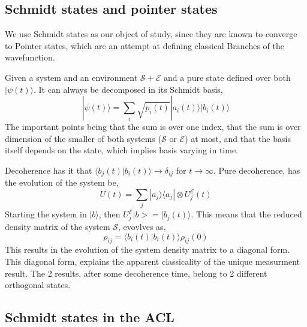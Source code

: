 \documentclass{article}
\begin{document}
\subsection{Schmidt states and pointer states}

We use Schmidt states as our object of study, since they are known to converge to Pointer states, which are an attempt at defining classical Branches of the wavefunction.


Given a system and an environment $\mathcal{S} + \mathcal{E}$ and a pure state defined over both $|\psi(t)\rangle$. It can always be decomposed in its Schmidt basis,
\begin{equation}
    |\psi(t)\rangle = \sum_i \sqrt{p_i(t)}|a_i(t)\rangle|b_i(t)\rangle
\end{equation}
The important points being that the sum is over one index, that the sum is over dimension of the smaller of both systems ($\mathcal{S}$ or $\mathcal{E}$) at most, and that the basis itself depends on the state, which implies basis varying in time.

Decoherence has it that $\langle b_j(t)|b_i(t)\rangle\rightarrow \delta_{ij}$ for $t\rightarrow \infty$. 
Pure decoherence, has the evolution of the system be,
\begin{equation}
    U(t)=\sum_j|a_j\rangle\langle a_j|\otimes U^{\mathcal{E}}_j(t)
\end{equation}
Starting the system in $|b\rangle$, then $U_j^{\mathcal{E}}|b>=|b_j(t)\rangle$. This means that the reduced density matrix of the system $\mathcal{S}$, evovlves as,
\begin{equation}
    \rho_{ij} = \langle b_i(t)|b_i(t)\rangle \rho_{ij}(0)
\end{equation}
This results in the evolution of the system density matrix to a diagonal form. This diagonal form, explains the apparent classicality of the unique measurment result. The 2 results, after some decoherence time, belong to 2 different orthogonal states. 

\subsection{Schmidt states in the ACL}
\end{document}
